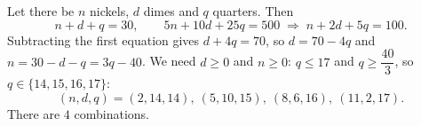 Let there be $n$ nickels, $d$ dimes and $q$ quarters. Then
\[
n+d+q=30,\qquad 5n+10d+25q=500 \;\Longrightarrow\; n+2d+5q=100 .
\]
Subtracting the first equation gives $d+4q=70$, so $d=70-4q$ and $n=30-d-q=3q-40$. We need $d\ge0$ and $n\ge0$: $q\le17$ and $q\ge\dfrac{40}{3}$, so $q\in\{14,15,16,17\}$:
\[
(n,d,q)=(2,14,14),\ (5,10,15),\ (8,6,16),\ (11,2,17).
\]
There are $\boxed{4}$ combinations.

